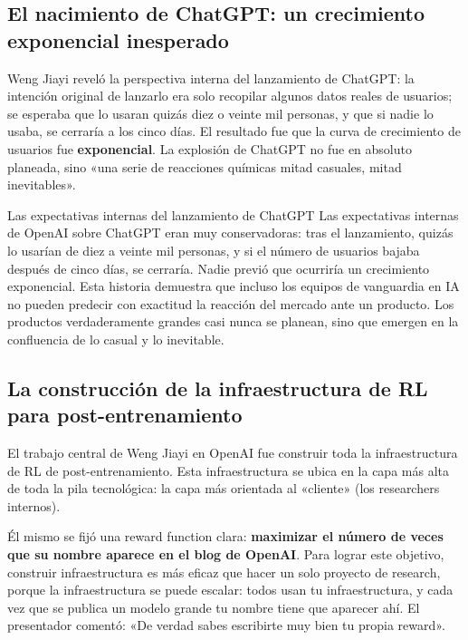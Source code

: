 \documentclass[a4paper]{article}
\begin{document}
\subsection{El nacimiento de ChatGPT: un crecimiento exponencial inesperado}

Weng Jiayi reveló la perspectiva interna del lanzamiento de ChatGPT: la intención original de lanzarlo era solo recopilar algunos datos reales de usuarios; se esperaba que lo usaran quizás diez o veinte mil personas, y que si nadie lo usaba, se cerraría a los cinco días. El resultado fue que la curva de crecimiento de usuarios fue \textbf{exponencial}. La explosión de ChatGPT no fue en absoluto planeada, sino «una serie de reacciones químicas mitad casuales, mitad inevitables».

\begin{knowledgebox}{Las expectativas internas del lanzamiento de ChatGPT}
Las expectativas internas de OpenAI sobre ChatGPT eran muy conservadoras: tras el lanzamiento, quizás lo usarían de diez a veinte mil personas, y si el número de usuarios bajaba después de cinco días, se cerraría. Nadie previó que ocurriría un crecimiento exponencial. Esta historia demuestra que incluso los equipos de vanguardia en IA no pueden predecir con exactitud la reacción del mercado ante un producto. Los productos verdaderamente grandes casi nunca se planean, sino que emergen en la confluencia de lo casual y lo inevitable.
\end{knowledgebox}

\subsection{La construcción de la infraestructura de RL para post-entrenamiento}

El trabajo central de Weng Jiayi en OpenAI fue construir toda la infraestructura de RL de post-entrenamiento. Esta infraestructura se ubica en la capa más alta de toda la pila tecnológica: la capa más orientada al «cliente» (los researchers internos).

Él mismo se fijó una reward function clara: \textbf{maximizar el número de veces que su nombre aparece en el blog de OpenAI}. Para lograr este objetivo, construir infraestructura es más eficaz que hacer un solo proyecto de research, porque la infraestructura se puede escalar: todos usan tu infraestructura, y cada vez que se publica un modelo grande tu nombre tiene que aparecer ahí. El presentador comentó: «De verdad sabes escribirte muy bien tu propia reward».
\end{document}
